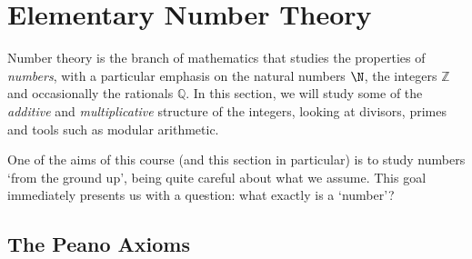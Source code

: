 \documentclass[a4paper]{scrartcl}
\begin{document}







\section{Elementary Number Theory}\label{ch:1}

Number theory is the branch of mathematics that studies the properties of \emph{numbers}, with a particular emphasis on the natural numbers $\N$, the integers $\mathbb{Z}$ and occasionally the rationals $\mathbb{Q}$. In this section, we will study some of the \emph{additive} and \emph{multiplicative} structure of the integers, looking at divisors, primes and tools such as modular arithmetic. 

One of the aims of this course (and this section in particular) is to study numbers `from the ground up', being quite careful about what we assume. This goal immediately presents us with a question: what exactly is a `number'?


\subsection{The Peano Axioms}
\end{document}
